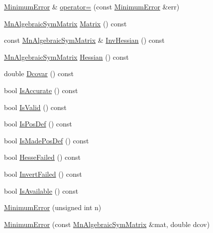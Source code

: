 \begin{DoxyCompactItemize}
\mbox{\hyperlink{classROOT_1_1Minuit2_1_1MinimumError}{Minimum\+Error}} \& \mbox{\hyperlink{classROOT_1_1Minuit2_1_1MinimumError_a991c1899c07aa31f7a61d77b648c07ad}{operator=}} (const \mbox{\hyperlink{classROOT_1_1Minuit2_1_1MinimumError}{Minimum\+Error}} \&err)
\item 
\mbox{\hyperlink{namespaceROOT_1_1Minuit2_a9e74ad97f5537a2e80e52b04d98ecc6e}{Mn\+Algebraic\+Sym\+Matrix}} \mbox{\hyperlink{classROOT_1_1Minuit2_1_1MinimumError_a7065d453e2892ed1c25b7f28d0c1aa66}{Matrix}} () const
\item 
const \mbox{\hyperlink{namespaceROOT_1_1Minuit2_a9e74ad97f5537a2e80e52b04d98ecc6e}{Mn\+Algebraic\+Sym\+Matrix}} \& \mbox{\hyperlink{classROOT_1_1Minuit2_1_1MinimumError_acfa9206a47e5fdf2d9aa1928aaf5cd04}{Inv\+Hessian}} () const
\item 
\mbox{\hyperlink{namespaceROOT_1_1Minuit2_a9e74ad97f5537a2e80e52b04d98ecc6e}{Mn\+Algebraic\+Sym\+Matrix}} \mbox{\hyperlink{classROOT_1_1Minuit2_1_1MinimumError_a7f591009a8e0d017a77da5efa5f6a7e0}{Hessian}} () const
\item 
double \mbox{\hyperlink{classROOT_1_1Minuit2_1_1MinimumError_acd4dec46c23542a2b79183a6d5fe6679}{Dcovar}} () const
\item 
bool \mbox{\hyperlink{classROOT_1_1Minuit2_1_1MinimumError_a70c9ff6b59f2c01e5e54b4010326753d}{Is\+Accurate}} () const
\item 
bool \mbox{\hyperlink{classROOT_1_1Minuit2_1_1MinimumError_a0e9a9c525f7ac2e5dc5c7973056a852b}{Is\+Valid}} () const
\item 
bool \mbox{\hyperlink{classROOT_1_1Minuit2_1_1MinimumError_afffbed3fdd6785c959ca619a59aaaf74}{Is\+Pos\+Def}} () const
\item 
bool \mbox{\hyperlink{classROOT_1_1Minuit2_1_1MinimumError_addbc60edad85c271c20be5ff18678599}{Is\+Made\+Pos\+Def}} () const
\item 
bool \mbox{\hyperlink{classROOT_1_1Minuit2_1_1MinimumError_adf8acb6ea4137162b034eb6b9a79d9b9}{Hesse\+Failed}} () const
\item 
bool \mbox{\hyperlink{classROOT_1_1Minuit2_1_1MinimumError_ae9f212180703d5504c281f90efee263a}{Invert\+Failed}} () const
\item 
bool \mbox{\hyperlink{classROOT_1_1Minuit2_1_1MinimumError_af03638c23ec7b5573c139810cdb640c0}{Is\+Available}} () const
\item 
\mbox{\hyperlink{classROOT_1_1Minuit2_1_1MinimumError_a4438a39dcecf1990ed8449d1bad58116}{Minimum\+Error}} (unsigned int n)
\item 
\mbox{\hyperlink{classROOT_1_1Minuit2_1_1MinimumError_ac124d3ba147dbb6ed30ec4ca75afe5b4}{Minimum\+Error}} (const \mbox{\hyperlink{namespaceROOT_1_1Minuit2_a9e74ad97f5537a2e80e52b04d98ecc6e}{Mn\+Algebraic\+Sym\+Matrix}} \&mat, double dcov)

\end{DoxyCompactItemize}
